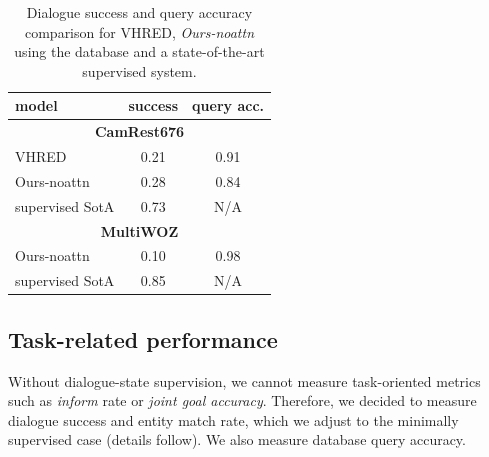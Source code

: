 \begin{table}[t]
    \centering\small
    \begin{tabular}{lcc}
      \toprule
      model &  success & query acc.\hspace{-2mm} \\
      \midrule
      \multicolumn{3}{c}{\textbf{CamRest676}} \\
      \midrule
      VHRED & 0.21 & 0.91 \\
      Ours-noattn & 0.28 & 0.84 \\\hdashline[0.5pt/2pt]
      supervised SotA \cite{peng2021soloist}\hspace{-2mm} & 0.73 & N/A \\
      \midrule
      \multicolumn{3}{c}{\textbf{MultiWOZ}} \\
      \midrule
      Ours-noattn & 0.10 & 0.98 \\\hdashline[0.5pt/2pt]
      supervised SotA \cite{peng2021soloist}\hspace{-2mm} & 0.85 & N/A \\
      \bottomrule
  \end{tabular}
  \caption{Dialogue success and query accuracy comparison for VHRED, \emph{Ours-noattn} using the database and a state-of-the-art supervised system.}
  \label{tab:success}
\end{table}

\subsection{Task-related performance}
\label{sec:succ}
Without dialogue-state supervision, we cannot measure task-oriented metrics such as \emph{inform} rate or \emph{joint goal accuracy}.
Therefore, we decided to measure dialogue success and entity match rate, which we adjust to the minimally supervised case (details follow). We also measure database query accuracy.

